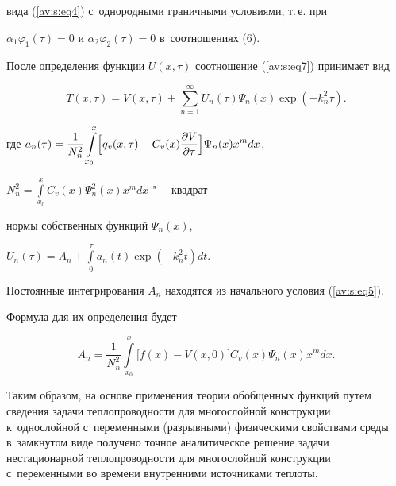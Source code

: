 вида (\ref{av:s:eq4}) с~однородными граничными условиями, т.\,е. при

$\alpha _1 \varphi _1 (\tau )=0$ и $\alpha _2 \varphi _2 ( \tau )=0$ в~соотношениях (6).



После определения функции $U(x, \tau )$ соотношение (\ref{av:s:eq7}) принимает вид

\begin{equation*}

\label{av:s:eq10}

T(x, \tau )=V(x, \tau )+\sum\limits_{n=1}^\infty U_n (\tau ) \Psi _n

(x)\exp(-k_n^2 \tau ).

\end{equation*}

где $\displaystyle a_n (\tau )=\frac{1}{N_n^2 }\int\limits_{x_0 }^x

\Bigl[ q_v (x,\tau)-C_v (x)\frac{\partial V}{\partial \tau }  \Bigr] \Psi _n (x)x^m dx$,

$\displaystyle N_n^2 =\int\limits_{x_0}^x C_v (x) \Psi _n^2 (x)x^m dx$ "--- квадрат

нормы собственных функций $\Psi _n (x)$,

$ \displaystyle

U_n (\tau )=A_n +\int\limits_0^\tau a_n (t)\exp(-k_n^2 t)dt.

$





Постоянные интегрирования $A_n $ находятся из начального условия (\ref{av:s:eq5}).

Формула для их определения будет

\[

A_n =\frac{1}{N_n^2}\int\limits_{x_0}^x \bigl[ f(x)-V(x, 0)\bigr]C_v(x)\Psi _n (x)x^mdx.

\]



Таким образом, на основе применения теории обобщенных функций путем сведения задачи теплопроводности для многослойной конструкции к~однослойной с~переменными (разрывными) физическими свойствами среды в~замкнутом виде получено точное аналитическое решение задачи нестационарной теплопроводности для многослойной конструкции с~переменными во времени внутренними источниками теплоты.





